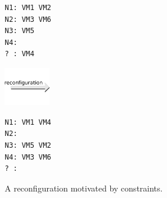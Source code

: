 \begin{reconfiguration}
\centering
\begin{minipage}[b]{0.40\textwidth}
\begin{lstlisting}
N1: VM1 VM2
N2: VM3 VM6
N3: VM5
N4: 
? : VM4
\end{lstlisting}
\end{minipage}
\begin{minipage}[b]{2cm}
\includegraphics[width=2cm]{img/arrow_reconfiguration}
\end{minipage}
\begin{minipage}[b]{0.40\textwidth}
\begin{lstlisting}
N1: VM1 VM4
N2:
N3: VM5 VM2
N4: VM3 VM6
? :
\end{lstlisting}
\end{minipage}
\caption{A reconfiguration motivated by  constraints.}\label{fig: gather}
\end{reconfiguration}

